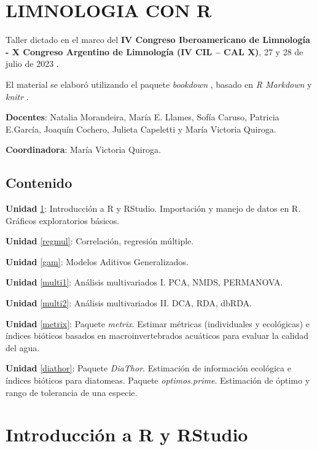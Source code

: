 \documentclass[
]{book}
\author{}
\date{\vspace{-2.5em}}
\begin{document}
{
\setcounter{tocdepth}{1}
\tableofcontents
}
\hypertarget{limnologia-con-r}{%
\chapter*{LIMNOLOGIA CON R}\label{limnologia-con-r}}

Taller dictado en el marco del \textbf{IV Congreso Iberoamericano de Limnología - X Congreso Argentino de Limnología (IV CIL -- CAL X)}, 27 y 28 de julio de 2023 .

El material se elaboró utilizando el paquete \emph{bookdown} \citep{R-bookdown, bookdown2016}, basado en \emph{R Markdown} \citep{rmarkdown2020} y \emph{knitr} \citep{xie2015}.

\textbf{Docentes}: Natalia Morandeira, María E. Llames, Sofía Caruso, Patricia E.García, Joaquín Cochero, Julieta Capeletti y María Victoria Quiroga.

\textbf{Coordinadora}: María Victoria Quiroga.

\hypertarget{contenido}{%
\section{Contenido}\label{contenido}}

\textbf{Unidad} \ref{intro}: Introducción a R y RStudio. Importación y manejo de datos en R. Gráficos exploratorios básicos.

\textbf{Unidad} \ref{regmul}: Correlación, regresión múltiple.

\textbf{Unidad} \ref{gam}: Modelos Aditivos Generalizados.

\textbf{Unidad} \ref{multi1}: Análisis multivariados I. PCA, NMDS, PERMANOVA.

\textbf{Unidad} \ref{multi2}: Análisis multivariados II. DCA, RDA, dbRDA.

\textbf{Unidad} \ref{metrix}: Paquete \emph{metrix}. Estimar métricas (individuales y ecológicas) e índices bióticos basados en macroinvertebrados acuáticos para evaluar la calidad del agua.

\textbf{Unidad} \ref{diathor}: Paquete \emph{DiaThor}. Estimación de información ecológica e índices bióticos para diatomeas. Paquete \emph{optimos.prime}. Estimación de óptimo y rango de tolerancia de una especie.

\hypertarget{intro}{%
\chapter{Introducción a R y RStudio}\label{intro}}
\end{document}
